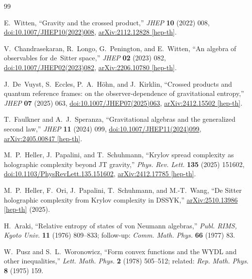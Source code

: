 \documentclass[12pt,a4paper]{article}
\theoremstyle{definition}
\begin{document}
\begin{thebibliography}{99}

E.~Witten,
``Gravity and the crossed product,''
\textit{JHEP} \textbf{10} (2022) 008,
\href{https://doi.org/10.1007/JHEP10(2022)008}{doi:10.1007/JHEP10(2022)008},
\href{https://arxiv.org/abs/2112.12828}{arXiv:2112.12828 [hep-th]}.

V.~Chandrasekaran, R.~Longo, G.~Penington, and E.~Witten,
``An algebra of observables for de~Sitter space,''
\textit{JHEP} \textbf{02} (2023) 082,
\href{https://doi.org/10.1007/JHEP02(2023)082}{doi:10.1007/JHEP02(2023)082},
\href{https://arxiv.org/abs/2206.10780}{arXiv:2206.10780 [hep-th]}.

J.~De~Vuyst, S.~Eccles, P.~A.~H\"{o}hn, and J.~Kirklin,
``Crossed products and quantum reference frames: on the observer-dependence
of gravitational entropy,''
\textit{JHEP} \textbf{07} (2025) 063,
\href{https://doi.org/10.1007/JHEP07(2025)063}{doi:10.1007/JHEP07(2025)063},
\href{https://arxiv.org/abs/2412.15502}{arXiv:2412.15502 [hep-th]}.

T.~Faulkner and A.~J.~Speranza,
``Gravitational algebras and the generalized second law,''
\textit{JHEP} \textbf{11} (2024) 099,
\href{https://doi.org/10.1007/JHEP11(2024)099}{doi:10.1007/JHEP11(2024)099},
\href{https://arxiv.org/abs/2405.00847}{arXiv:2405.00847 [hep-th]}.

M.~P.~Heller, J.~Papalini, and T.~Schuhmann,
``Krylov spread complexity as holographic complexity beyond JT gravity,''
\textit{Phys. Rev. Lett.} \textbf{135} (2025) 151602,
\href{https://doi.org/10.1103/PhysRevLett.135.151602}{doi:10.1103/PhysRevLett.135.151602},
\href{https://arxiv.org/abs/2412.17785}{arXiv:2412.17785 [hep-th]}.

M.~P.~Heller, F.~Ori, J.~Papalini, T.~Schuhmann, and M.-T.~Wang,
``De Sitter holographic complexity from Krylov complexity in DSSYK,''
\href{https://arxiv.org/abs/2510.13986}{arXiv:2510.13986 [hep-th]} (2025).

H.~Araki,
``Relative entropy of states of von Neumann algebras,''
\textit{Publ. RIMS, Kyoto Univ.} \textbf{11} (1976) 809--833;
follow-up: \textit{Comm. Math. Phys.} \textbf{66} (1977) 83.

W.~Pusz and S.~L.~Woronowicz,
``Form convex functions and the WYDL and other inequalities,''
\textit{Lett. Math. Phys.} \textbf{2} (1978) 505--512;
related: \textit{Rep. Math. Phys.} \textbf{8} (1975) 159.


\end{thebibliography}
\end{document}
